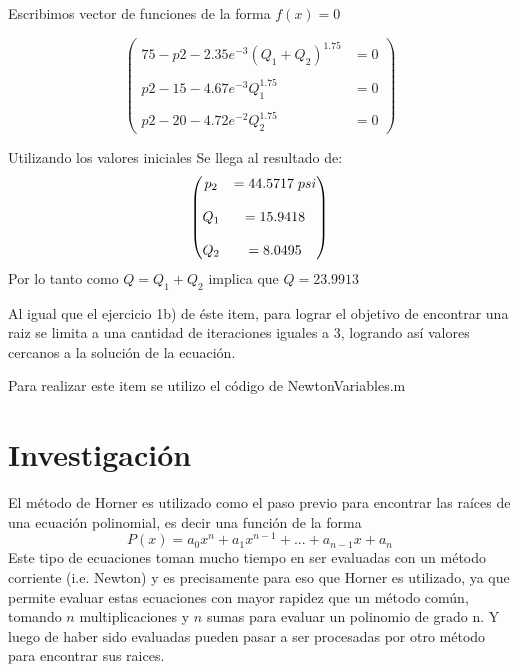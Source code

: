\documentclass{udpreport}
\begin{document}
\begin{enumerate}
    Escribimos vector de funciones de la forma $f(x) = 0$

   $$\begin{pmatrix}
        75 - p2 - 2.35e^{-3}(Q_1+Q_2)^{1.75} &= 0 \\
        \\
        p2 - 15 - 4.67e^{-3}Q_1^{1.75} &= 0  \\
        \\
        p2 - 20 - 4.72e^{-2}Q_2^{1.75} &= 0
    \end{pmatrix}$$
    
    Utilizando los valores iniciales Se llega al resultado de: 
    $$\begin{pmatrix}
        p_2 &=44.5717 \hspace{0.1cm} psi \\
        \\
        Q_1 &=15.9418 \\
        \\
        Q_2 &=8.0495
    \end{pmatrix}$$
    Por lo tanto como $Q = Q_1 + Q_2 $ implica que $ Q = 23.9913 $
    
    Al igual que el ejercicio 1b) de éste item, para lograr el objetivo de encontrar una raiz se limita a una cantidad de iteraciones iguales a 3, logrando así valores cercanos a la solución de la ecuación.
    
    Para realizar este item se utilizo el código de NewtonVariables.m
    \end{enumerate}
    \newpage
    \chapter{Investigación}
    El método de Horner es utilizado como el paso previo para encontrar las raíces de una ecuación polinomial, es decir una función de la forma $$P(x)=a_{0}x^{n}+a_{1}x^{n-1}+...+a_{n-1}x+a_{n}$$
    Este tipo de ecuaciones toman mucho tiempo en ser evaluadas con un método corriente (i.e. Newton) y es precisamente para eso que Horner es utilizado, ya que permite evaluar estas ecuaciones con mayor rapidez que un método común, tomando $n$ multiplicaciones y $n$ sumas para evaluar un polinomio de grado n. Y luego de haber sido evaluadas pueden pasar a ser procesadas por otro método para encontrar sus raices.
    
\end{document}
